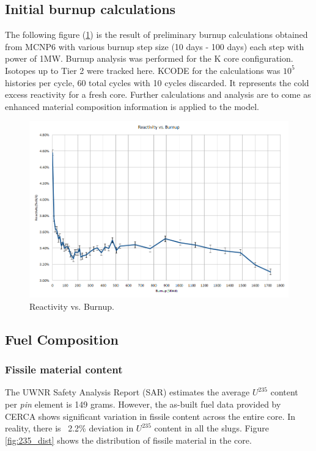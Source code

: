 \documentclass{UWNR_modeling}
\begin{document}
\subsection{Initial burnup calculations}
The following figure (\ref{fig:burnup_reactivity}) is the result of preliminary burnup calculations obtained from MCNP6 with various burnup step size (10 days - 100 days) each step with power of 1MW. Burnup analysis was performed for the K core configuration. Isotopes up to Tier 2 were tracked here. KCODE for the calculations was $10^{5}$ histories per cycle, 60 total cycles with 10 cycles discarded. It represents the cold excess reactivity for a fresh core. Further calculations and analysis are to come as enhanced material composition information is applied to the model.
\begin{figure}[H]
  \centering
  \includegraphics[width=6in]{burnup_fig.png}
  \caption{Reactivity vs. Burnup.}
  \label{fig:burnup_reactivity}
\end{figure}


\subsection{Fuel Composition}
\subsubsection{Fissile material content}
The UWNR Safety Analysis Report (SAR) estimates the average $U^{235}$ content per \emph{pin} element is 149 grams\cite{SAR}. However, the as-built fuel data provided by CERCA shows significant variation in fissile content across the entire core. In reality, there is ~2.2\% deviation in $U^{235}$ content in all the slugs. Figure \ref{fig:235_dist} shows the distribution of fissile material in the core.
\end{document}
